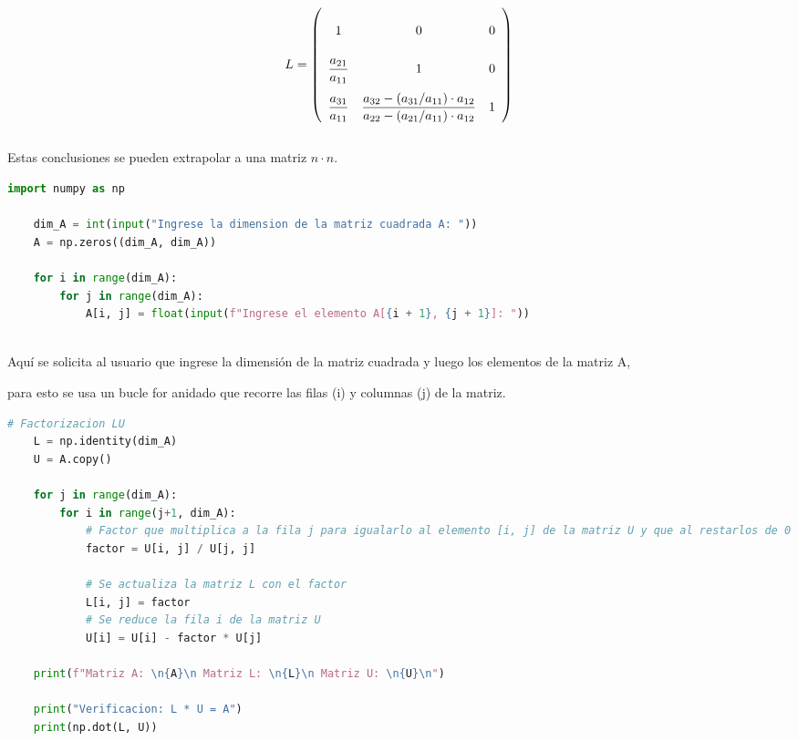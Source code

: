 \documentclass[letterpaper,12pt]{article}
\begin{document}
\[
L =
\renewcommand{\arraystretch}{2.5} 
\left(
\begin{array}{ccc}
1 & 0 & 0 \\
\dfrac{a_{21}}{a_{11}} & 1 & 0 \\
\dfrac{a_{31}}{a_{11}} & \dfrac{a_{32}-(a_{31}/a_{11})\cdot a_{12}}{a_{22}-(a_{21}/a_{11})\cdot a_{12}} & 1 \\
\end{array}
\right)
\]
\\
Estas conclusiones se pueden extrapolar a una matriz $n\cdot n$.
\\

\begin{lstlisting}[style=jupyter, language=Python, caption={Construyendo la Matriz A}]
    import numpy as np

    dim_A = int(input("Ingrese la dimension de la matriz cuadrada A: "))
    A = np.zeros((dim_A, dim_A))
    
    for i in range(dim_A):
        for j in range(dim_A):
            A[i, j] = float(input(f"Ingrese el elemento A[{i + 1}, {j + 1}]: "))
\end{lstlisting}
\\
Aquí se solicita al usuario que ingrese la dimensión de la matriz cuadrada y luego los elementos de la matriz A, 

para esto se usa un bucle for anidado que recorre las filas (i) y columnas (j) de la matriz.
\\
\begin{lstlisting}[style=jupyter, language=Python, caption={Factorizando}]
    # Factorizacion LU
    L = np.identity(dim_A)
    U = A.copy()
    
    for j in range(dim_A):
        for i in range(j+1, dim_A):
            # Factor que multiplica a la fila j para igualarlo al elemento [i, j] de la matriz U y que al restarlos de 0
            factor = U[i, j] / U[j, j]
    
            # Se actualiza la matriz L con el factor
            L[i, j] = factor
            # Se reduce la fila i de la matriz U
            U[i] = U[i] - factor * U[j]
    
    print(f"Matriz A: \n{A}\n Matriz L: \n{L}\n Matriz U: \n{U}\n")
    
    print("Verificacion: L * U = A")
    print(np.dot(L, U))
\end{lstlisting}
\end{document}
